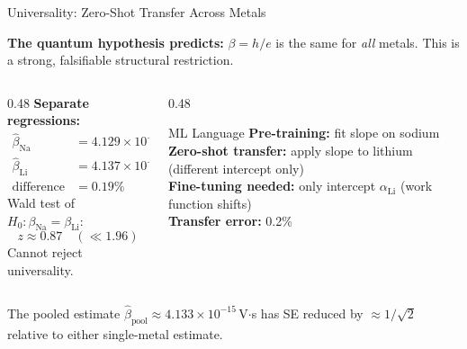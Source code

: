 \documentclass[aspectratio=169,12pt]{beamer}
\begin{document}
\begin{frame}[shrink=10]{Universality: Zero-Shot Transfer Across Metals}

\textbf{The quantum hypothesis predicts:} $\beta = h/e$ is the same for
\emph{all} metals.  This is a strong, falsifiable structural restriction.

\bigskip
\begin{columns}[T]
\begin{column}{0.48\textwidth}
\textbf{Separate regressions:}
\begin{align*}
  \hat\beta_{\mathrm{Na}} &= 4.129\times10^{-15}\;\text{V$\cdot$s} \\
  \hat\beta_{\mathrm{Li}} &= 4.137\times10^{-15}\;\text{V$\cdot$s} \\
  \text{difference} &= 0.19\%
\end{align*}
Wald test of $H_0: \beta_{\mathrm{Na}} = \beta_{\mathrm{Li}}$:
\[
  z \approx 0.87 \quad (\ll 1.96)
\]
Cannot reject universality.
\end{column}
\begin{column}{0.48\textwidth}
\begin{alertblock}{ML Language}
\textbf{Pre-training:} fit slope on sodium\\[4pt]
\textbf{Zero-shot transfer:} apply slope
to lithium (different intercept only)\\[4pt]
\textbf{Fine-tuning needed:} only intercept
$\alpha_{\mathrm{Li}}$ (work function shifts)\\[4pt]
\textbf{Transfer error:} 0.2\%
\end{alertblock}
\end{column}
\end{columns}

\bigskip
The pooled estimate $\hat\beta_{\mathrm{pool}} \approx 4.133\times10^{-15}$\,V$\cdot$s
has SE reduced by $\approx 1/\sqrt{2}$ relative to either single-metal estimate.

\end{frame}
\end{document}
